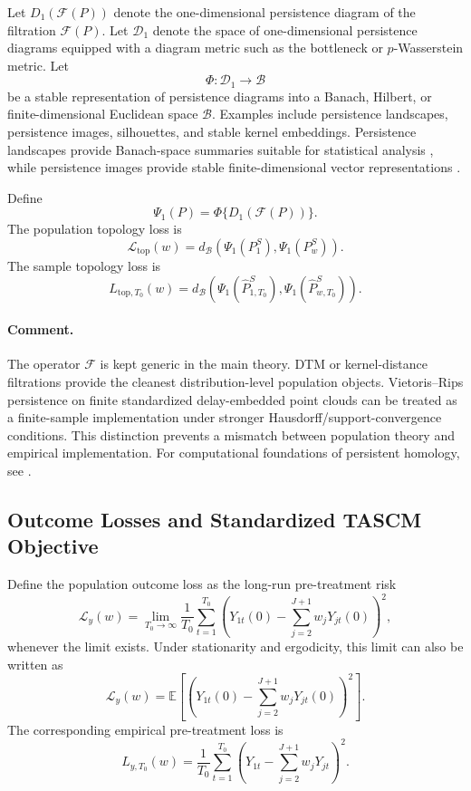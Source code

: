 \documentclass[11pt]{article}
\theoremstyle{plain}
\theoremstyle{definition}
\theoremstyle{remark}
\newcommand{\1}{\mathbbm{1}}
\begin{document}
Let \(D_1(\mathcal F(P))\) denote the one-dimensional persistence diagram of
the filtration \(\mathcal F(P)\). Let \(\mathcal D_1\) denote the space of
one-dimensional persistence diagrams equipped with a diagram metric such as the
bottleneck or \(p\)-Wasserstein metric. Let
\[
\Phi:\mathcal D_1\to \mathcal B
\]
be a stable representation of persistence diagrams into a Banach, Hilbert, or
finite-dimensional Euclidean space \(\mathcal B\). Examples include
persistence landscapes, persistence images, silhouettes, and stable kernel
embeddings. Persistence landscapes provide Banach-space summaries suitable for
statistical analysis \citep{bubenik2015statistical}, while persistence images
provide stable finite-dimensional vector representations
\citep{adams2017persistence}.

Define
\[
\Psi_1(P)
=
\Phi\{D_1(\mathcal F(P))\}.
\]
The population topology loss is
\[
\mathcal L_{\mathrm{top}}(w)
=
d_{\mathcal B}
\left(
\Psi_1(P_1^{S}),
\Psi_1(P_w^{S})
\right).
\]
The sample topology loss is
\[
L_{\mathrm{top},T_0}(w)
=
d_{\mathcal B}
\left(
\Psi_1(\widehat P_{1,T_0}^{S}),
\Psi_1(\widehat P_{w,T_0}^{S})
\right).
\]

\paragraph{Comment.}
The operator \(\mathcal F\) is kept generic in the main theory. DTM or
kernel-distance filtrations provide the cleanest distribution-level population
objects. Vietoris--Rips persistence on finite standardized delay-embedded point
clouds can be treated as a finite-sample implementation under stronger
Hausdorff/support-convergence conditions. This distinction prevents a mismatch
between population theory and empirical implementation. For computational
foundations of persistent homology, see \citet{zomorodian2005computing}.

\subsection{Outcome Losses and Standardized TASCM Objective}

Define the population outcome loss as the long-run pre-treatment risk
\[
\mathcal L_y(w)
=
\lim_{T_0\to\infty}
\frac{1}{T_0}
\sum_{t=1}^{T_0}
\left(
Y_{1t}(0)
-
\sum_{j=2}^{J+1}w_jY_{jt}(0)
\right)^2,
\]
whenever the limit exists. Under stationarity and ergodicity, this limit can
also be written as
\[
\mathcal L_y(w)
=
\mathbb E
\left[
\left(
Y_{1t}(0)
-
\sum_{j=2}^{J+1}w_jY_{jt}(0)
\right)^2
\right].
\]
The corresponding empirical pre-treatment loss is
\[
L_{y,T_0}(w)
=
\frac{1}{T_0}
\sum_{t=1}^{T_0}
\left(
Y_{1t}
-
\sum_{j=2}^{J+1}w_jY_{jt}
\right)^2.
\]
\end{document}
